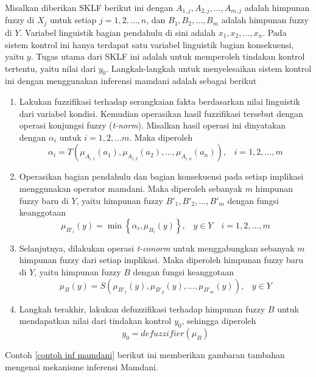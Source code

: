 \noindent Misalkan diberikan SKLF berikut ini
\flcmamdani
dengan $A_{1,j},A_{2,j}, \ldots, A_{m,j}$ adalah himpunan fuzzy di $X_j$ untuk setiap $j=1,2,\ldots,n$, dan $B_1, B_2, \ldots, B_m$ adalah himpunan fuzzy di $Y$. Variabel linguistik bagian pendahulu di sini adalah $x_1,x_2,\ldots,x_n$. Pada sistem kontrol ini hanya terdapat satu variabel linguistik bagian konsekuensi, yaitu $y$. Tugas utama dari SKLF ini adalah untuk memperoleh tindakan kontrol tertentu, yaitu nilai dari $y_0$.
Langkah-langkah untuk menyelesaikan sistem kontrol ini dengan menggunakan inferensi mamdani adalah sebagai berikut
\begin{enumerate}
\item Lakukan fuzzifikasi terhadap serangkaian fakta berdasarkan nilai linguistik dari variabel kondisi. Kemudian operasikan hasil fuzzifikasi tersebut dengan operasi konjungsi fuzzy (\emph{t-norm}). Misalkan hasil operasi ini dinyatakan dengan $\alpha_i$ untuk $i=1,2,\ldots m$. Maka diperoleh
\[\alpha_i = T\left( \mu_{A_{i,1}}(a_1),\mu_{A_{i,2}}(a_2),\ldots,\mu_{A_{i,n}}(a_n) \right)
\text{,} \quad i = 1,2,\ldots,m
\]
\item Operasikan bagian pendahulu dan bagian konsekuensi pada setiap implikasi menggunakan operator mamdani. Maka diperoleh sebanyak $m$ himpunan fuzzy baru di $Y$, yaitu himpunan fuzzy $B'_1, B'_2, \ldots, B'_m$ dengan fungsi keanggotaan
\[ \mu_{B'_i}(y) = \min \left\{ \alpha_i, \mu_{B_i}(y) \right\}
\text{,} \quad y \in Y \quad i = 1,2,\ldots,m
\]
\item Selanjutnya, dilakukan operasi \emph{t-conorm} untuk menggabungkan sebanyak $m$ himpunan fuzzy dari setiap implikasi. Maka diperoleh himpunan fuzzy baru di $Y$, yaitu himpunan fuzzy $B$ dengan fungsi keanggotaan
\[ \mu_B(y) = S\left(\mu_{B'_1}(y),\mu_{B'_2}(y),\ldots,\mu_{B'_m}(y)\right)
\text{,} \quad y \in Y
\]
\item Langkah terakhir, lakukan defuzzifikasi terhadap himpunan fuzzy $B$ untuk mendapatkan nilai dari tindakan kontrol $y_0$, sehingga diperoleh
\[ y_0 = defuzzifier(\mu_B) \]
\end{enumerate}

\noindent Contoh \ref{contoh inf mamdani} berikut ini memberikan gambaran tambahan mengenai mekanisme inferensi Mamdani.

